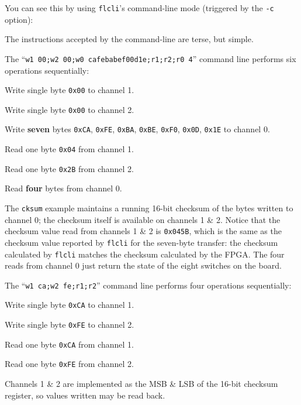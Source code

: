 You can see this by using \texttt{flcli}'s command-line mode (triggered by the \texttt{-c} option):


The instructions accepted by the command-line are terse, but simple.

The ``\texttt{w1 00;w2 00;w0 cafebabef00d1e;r1;r2;r0 4}'' command line performs six operations sequentially:

\begin{blobs}
  \item Write single byte \texttt{0x00} to channel 1.
  \item Write single byte \texttt{0x00} to channel 2.
  \item Write \textbf{seven} bytes \texttt{0xCA}, \texttt{0xFE}, \texttt{0xBA}, \texttt{0xBE}, \texttt{0xF0}, \texttt{0x0D}, \texttt{0x1E} to channel 0.
  \item Read one byte \texttt{0x04} from channel 1.
  \item Read one byte \texttt{0x2B} from channel 2.
  \item Read \textbf{four} bytes from channel 0.
\end{blobs}

The \texttt{cksum} example maintains a running 16-bit checksum of the bytes written to channel 0; the checksum itself is available on channels 1 \& 2. Notice that the checksum value read from channels 1 \& 2 is \texttt{0x045B}, which is the same as the checksum value reported by \texttt{flcli} for the seven-byte transfer: the checksum calculated by \texttt{flcli} matches the checksum calculated by the FPGA. The four reads from channel 0 just return the state of the eight switches on the board.

The ``\texttt{w1 ca;w2 fe;r1;r2}'' command line performs four operations sequentially:

\begin{blobs}
  \item Write single byte \texttt{0xCA} to channel 1.
  \item Write single byte \texttt{0xFE} to channel 2.
  \item Read one byte \texttt{0xCA} from channel 1.
  \item Read one byte \texttt{0xFE} from channel 2.
\end{blobs}

Channels 1 \& 2 are implemented as the MSB \& LSB of the 16-bit checksum register, so values written may be read back.

